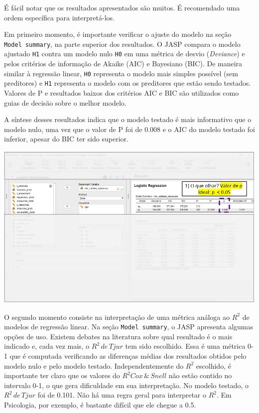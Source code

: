 \documentclass[
]{book}
\begin{document}
É fácil notar que os resultados apresentados são muitos. É recomendado uma ordem específica para interpretá-los.

Em primeiro momento, é importante verificar o ajuste do modelo na seção \texttt{Model\ summary}, na parte superior dos resultados. O JASP compara o modelo ajustado \texttt{H1} contra um modelo nulo \texttt{H0} em uma métrica de desvio (\emph{Deviance}) e pelos critérios de informação de Akaike (AIC) e Bayesiano (BIC). De maneira similar à regressão linear, \texttt{H0} representa o modelo mais simples possível (sem preditores) e \texttt{H1} representa o modelo com os preditores que estão sendo testados. Valores de P e resultados baixos dos critérios AIC e BIC são utilizados como guias de decisão sobre o melhor modelo.

A síntese desses resultados indica que o modelo testado é mais informativo que o modelo nulo, uma vez que o valor de P foi de 0.008 e o AIC do modelo testado foi inferior, apesar do BIC ter sido superior.

\includegraphics{./img/cap_logistica_resultado_1.png}

O segundo momento consiste na interpretação de uma métrica análoga ao \(R^2\) de modelos de regressão linear. Na seção \texttt{Model\ summary}, o JASP apresenta algumas opções de uso. Existem debates na literatura sobre qual resultado é o mais indicado e, cada vez mais, o \(R^2 \, de \, Tjur\) tem sido escolhido. Essa é uma métrica 0-1 que é computada verificando as diferenças médias dos resultados obtidos pelo modelo nulo e pelo modelo testado. Independentemente do \(R^2\) escolhido, é importante ter claro que os valores do \(R^2 {Cox\,\& \,Snell}\) não estão contido no intervalo 0-1, o que gera dificuldade em sua interpretação. No modelo testado, o \(R^2 \, de \, Tjur\) foi de 0.101. Não há uma regra geral para interpretar o \(R^2\). Em Psicologia, por exemplo, é bastante difícil que ele chegue a 0.5.
\end{document}

